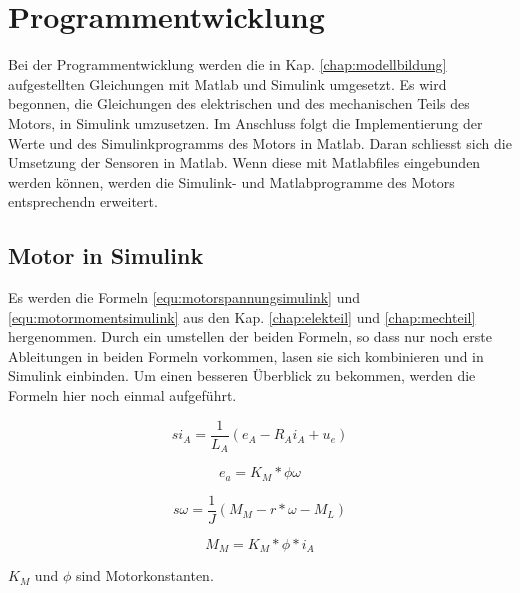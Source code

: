 \newpage




\chapter{Programmentwicklung}
\label{chap:Programmentwicklung}
Bei der Programmentwicklung werden die in Kap. \ref{chap:modellbildung} aufgestellten Gleichungen mit Matlab und Simulink umgesetzt.
Es wird begonnen, die Gleichungen des elektrischen und des mechanischen Teils des Motors, in Simulink umzusetzen.
Im Anschluss folgt die Implementierung der Werte und des Simulinkprogramms des Motors in Matlab.
Daran schliesst sich die Umsetzung der Sensoren in Matlab.
Wenn diese mit Matlabfiles eingebunden werden können, werden die Simulink- und Matlabprogramme des Motors entsprechendn erweitert.

\section{Motor in Simulink}
Es werden die Formeln \ref{equ:motorspannungsimulink} und \ref{equ:motormomentsimulink} aus den Kap. \ref{chap:elekteil} und \ref{chap:mechteil} hergenommen.
Durch ein umstellen der beiden Formeln, so dass nur noch erste Ableitungen in beiden Formeln vorkommen,
lasen sie sich kombinieren und in Simulink einbinden.
Um einen besseren Überblick zu bekommen, werden die Formeln hier noch einmal aufgeführt.
\begin{center}
\begin{equation}
\label{equ:motorspannungsimulink2}
si_A = \frac{1}{L_A} (e_A - R_Ai_A + u_e)
\end{equation}
\end{center}
\begin{center}
\begin{equation}
\label{equ:motorspannungsimulinkkonst2}
e_a = K_M * \phi \omega
\end{equation}
\end{center}
\begin{center}
\begin{equation}
\label{equ:motormomentsimulink2}
s\omega = \frac{1}{J} (M_M - r * \omega - M_L)
\end{equation}
\end{center}
\begin{center}
\begin{equation}
\label{equ:motormomentsimulinkkonst2}
M_M = K_M * \phi *i_A
\end{equation}
\end{center}
$K_M$ und $\phi$ sind Motorkonstanten.

